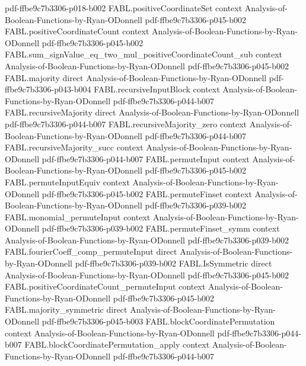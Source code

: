 \begin{theorem}
  {pdf-ffbe9c7b3306-p018-b002}
\proofstep
  {FABL.positiveCoordinateSet}
  {context}
  {Analysis-of-Boolean-Functions-by-Ryan-ODonnell}
  {pdf-ffbe9c7b3306-p045-b002}
\proofstep
  {FABL.positiveCoordinateCount}
  {context}
  {Analysis-of-Boolean-Functions-by-Ryan-ODonnell}
  {pdf-ffbe9c7b3306-p045-b002}
\proofstep
  {FABL.sum_signValue_eq_two_mul_positiveCoordinateCount_sub}
  {context}
  {Analysis-of-Boolean-Functions-by-Ryan-ODonnell}
  {pdf-ffbe9c7b3306-p045-b002}
\proofstep
  {FABL.majority}
  {direct}
  {Analysis-of-Boolean-Functions-by-Ryan-ODonnell}
  {pdf-ffbe9c7b3306-p043-b004}
\proofstep
  {FABL.recursiveInputBlock}
  {context}
  {Analysis-of-Boolean-Functions-by-Ryan-ODonnell}
  {pdf-ffbe9c7b3306-p044-b007}
\proofstep
  {FABL.recursiveMajority}
  {direct}
  {Analysis-of-Boolean-Functions-by-Ryan-ODonnell}
  {pdf-ffbe9c7b3306-p044-b007}
\proofstep
  {FABL.recursiveMajority_zero}
  {context}
  {Analysis-of-Boolean-Functions-by-Ryan-ODonnell}
  {pdf-ffbe9c7b3306-p044-b007}
\proofstep
  {FABL.recursiveMajority_succ}
  {context}
  {Analysis-of-Boolean-Functions-by-Ryan-ODonnell}
  {pdf-ffbe9c7b3306-p044-b007}
\proofstep
  {FABL.permuteInput}
  {context}
  {Analysis-of-Boolean-Functions-by-Ryan-ODonnell}
  {pdf-ffbe9c7b3306-p045-b002}
\proofstep
  {FABL.permuteInputEquiv}
  {context}
  {Analysis-of-Boolean-Functions-by-Ryan-ODonnell}
  {pdf-ffbe9c7b3306-p045-b002}
\proofstep
  {FABL.permuteFinset}
  {context}
  {Analysis-of-Boolean-Functions-by-Ryan-ODonnell}
  {pdf-ffbe9c7b3306-p039-b002}
\proofstep
  {FABL.monomial_permuteInput}
  {context}
  {Analysis-of-Boolean-Functions-by-Ryan-ODonnell}
  {pdf-ffbe9c7b3306-p039-b002}
\proofstep
  {FABL.permuteFinset_symm}
  {context}
  {Analysis-of-Boolean-Functions-by-Ryan-ODonnell}
  {pdf-ffbe9c7b3306-p039-b002}
\proofstep
  {FABL.fourierCoeff_comp_permuteInput}
  {direct}
  {Analysis-of-Boolean-Functions-by-Ryan-ODonnell}
  {pdf-ffbe9c7b3306-p039-b002}
\proofstep
  {FABL.IsSymmetric}
  {direct}
  {Analysis-of-Boolean-Functions-by-Ryan-ODonnell}
  {pdf-ffbe9c7b3306-p045-b002}
\proofstep
  {FABL.positiveCoordinateCount_permuteInput}
  {context}
  {Analysis-of-Boolean-Functions-by-Ryan-ODonnell}
  {pdf-ffbe9c7b3306-p045-b002}
\proofstep
  {FABL.majority_symmetric}
  {direct}
  {Analysis-of-Boolean-Functions-by-Ryan-ODonnell}
  {pdf-ffbe9c7b3306-p045-b003}
\proofstep
  {FABL.blockCoordinatePermutation}
  {context}
  {Analysis-of-Boolean-Functions-by-Ryan-ODonnell}
  {pdf-ffbe9c7b3306-p044-b007}
\proofstep
  {FABL.blockCoordinatePermutation_apply}
  {context}
  {Analysis-of-Boolean-Functions-by-Ryan-ODonnell}
  {pdf-ffbe9c7b3306-p044-b007}

\end{theorem}
